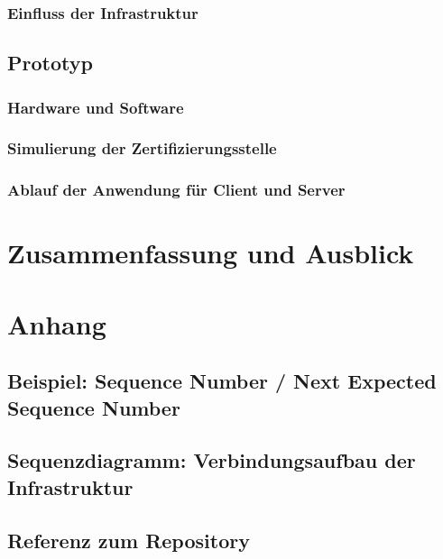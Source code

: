 \documentclass[doktyp=barbeit]{TUBAFarbeiten}
\begin{document}
		\subsubsection{Einfluss der Infrastruktur}
			\label{sec: impl einfluss der infrastruktur}
			

	\subsection{Prototyp}
		\label{sec: impl prototyp allgemein}
		

		\subsubsection{Hardware und Software}
			\label{sec: impl soft hard}
			

		\subsubsection{Simulierung der Zertifizierungsstelle}
			\label{sec: impl prototyp zertifizierungstelle}
			

		\subsubsection{Ablauf der Anwendung für Client und Server}
			\label{sec: impl prototyp anwendung}
			

\newpage
\section{Zusammenfassung und Ausblick}
	

\newpage
\section{Anhang}
	\subsection{Beispiel: Sequence Number / Next Expected Sequence Number}
		\label{sec: anhang nesn sn}
		

	\newpage
	\subsection{Sequenzdiagramm: Verbindungsaufbau der Infrastruktur}
		\label{sec: anhang infra verb aufbau}
		

	\newpage
	\subsection{Referenz zum Repository}
		\label{sec: anhang repo}
		

\newpage
\printbibliography[heading=bibintoc]
\end{document}
